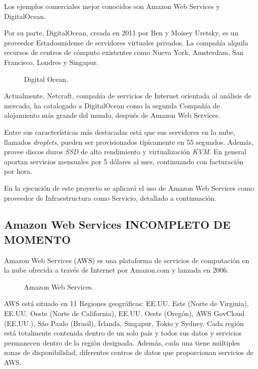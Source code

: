 Los ejemplos comerciales mejor conocidos son Amazon Web Services y DigitalOcean.

Por su parte, DigitalOcean, creada en 2011 por Ben y Moisey Uretsky, es un proveedor Estadounidense de servidores virtuales privados. La compañía alquila recursos de centros de cómputo existentes como Nueva York, Amsterdam, San Francisco, Londres y Singapur.

\begin{figure}[H]
\caption{Digital Ocean.\label{fig:figure_placement_example}}
\end{figure}

Actualmente, Netcraft, compañía de servicios de Internet orientada al análisis de mercado, ha catalogado a DigitalOcean como la segunda Compañía de alojamiento más grande del mundo, después de Amazon Web Services.

Entre sus características más destacadas está que sus servidores en la nube, llamados \textit{droplets}, pueden ser provisionados típicamente en 55 segundos. Además, provee discos duros \textit{SSD} de alto rendimiento y virtualización \textit{KVM}. En general aportan servicios mensuales por 5 dólares al mes, continuando con facturación por hora.

En la ejecución de este proyecto se aplicará el uso de Amazon Web Services como proveedor de Infraestructura como Servicio, detallado a continuación.

\subsection{Amazon Web Services INCOMPLETO DE MOMENTO}

Amazon Web Services (AWS) es una plataforma de servicios de computación en la nube ofrecida a través de Internet por Amazon.com y lanzada en 2006.

\begin{figure}[H]
\caption{Amazon Web Services.\label{fig:figure_placement_example}}
\end{figure}

AWS está situado en 11 Regiones geográficas: EE.UU. Este (Norte de Virginia), EE.UU. Oeste (Norte de California), EE.UU. Oeste (Oregón), AWS GovCloud (EE.UU.), São Paulo (Brasil), Irlanda, Singapur, Tokio y Sydney. Cada región está totalmente contenida dentro de un solo país y todos sus datos y servicios permanecen dentro de la región designada. Además, cada una tiene múltiples zonas de disponibilidad, diferentes centros de datos que proporcionan servicios de AWS.

